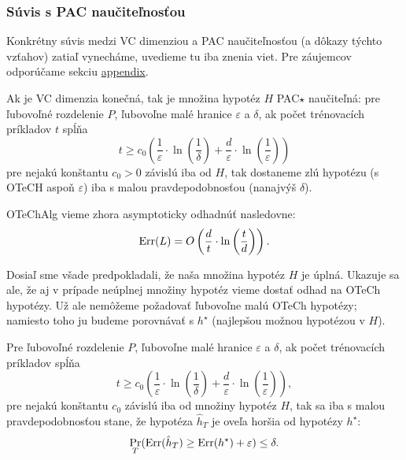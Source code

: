 \subsubsection{Súvis s PAC naučiteľnosťou}

Konkrétny súvis medzi VC dimenziou a PAC naučiteľnosťou (a dôkazy týchto
vzťahov) zatiaľ vynecháme, uvedieme tu iba znenia viet. Pre záujemcov
odporúčame sekciu \hyperref[vcdim:proof]{appendix}.

\begin{theorem}
  Ak je VC dimenzia konečná, tak je množina hypotéz $H$ PAC$\star$
  naučiteľná: pre ľubovoľné rozdelenie $P$, ľubovoľne malé hranice
  $\varepsilon$ a $\delta$, ak počet trénovacích príkladov $t$ spĺňa
  $$ t \geq c_0 \left( \frac{1}{\varepsilon} \cdot \ln \left( \frac{1}{\delta} \right) + \frac{d}{\varepsilon} \cdot \ln \left( \frac{1}{\varepsilon} \right) \right) $$
  pre nejakú konštantu $c_0 > 0$ závislú iba od $H$, tak dostaneme
  zlú hypotézu (s OTeCH aspoň $\varepsilon$) iba s malou
  pravdepodobnosťou (nanajvýš $\delta$).
\end{theorem}

\begin{theorem}
  OTeChAlg vieme zhora asymptoticky odhadnúť nasledovne:
  $$ \mathrm{Err}(L) = O \left( \frac{d}{t} \cdot \ln \left( \frac{t}{d} \right) \right). $$
\end{theorem}

Dosiaľ sme všade predpokladali, že naša množina hypotéz $H$ je úplná.
Ukazuje sa ale, že aj v prípade neúplnej množiny hypotéz vieme dostať
odhad na OTeCh hypotézy. Už ale nemôžeme požadovať ľubovoľne malú OTeCh
hypotézy; namiesto toho ju budeme porovnávať s $h^\star$ (najlepšou
možnou hypotézou v $H$).

\begin{theorem}
  Pre ľubovoľné rozdelenie $P$, ľubovoľne malé hranice $\varepsilon$
  a $\delta$, ak počet trénovacích príkladov spĺňa
  $$ t \geq c_0 \left( \frac{1}{\varepsilon} \cdot \ln \left( \frac{1}{\delta} \right) + \frac{d}{\varepsilon} \cdot \ln \left( \frac{1}{\varepsilon} \right) \right), $$
  pre nejakú konštantu $c_0$ závislú iba od množiny hypotéz $H$,
  tak sa iba s malou pravdepodobnosťou stane, že hypotéza $\hat{h}_T$
  je oveľa horšia od hypotézy $h^\star$:
  $$ \operatorname*{\textstyle\mathrm{Pr}}_T( \mathrm{Err}(\hat{h}_T) \geq \mathrm{Err}(h^\star) + \varepsilon ) \leq \delta. $$
\end{theorem}


